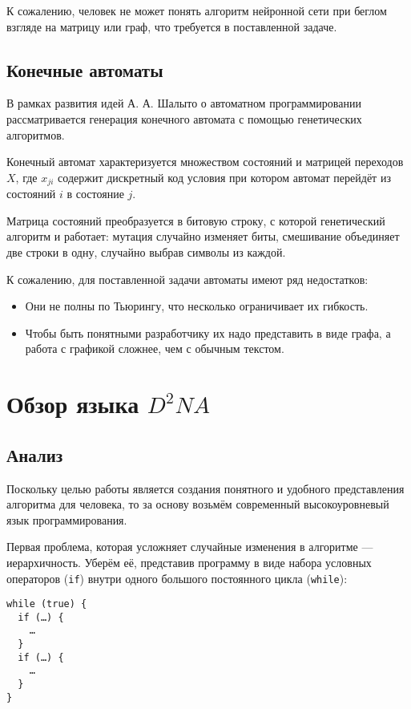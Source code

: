 \documentclass[utf8,a5paper,portrait,10pt]{eskdtext}
\begin{document}
К сожалению, человек не может понять алгоритм нейронной сети при беглом взгляде
на матрицу или граф, что требуется в поставленной задаче.

\subsection{Конечные автоматы}

В рамках развития идей А. А. Шалыто о автоматном программировании
рассматривается генерация конечного автомата с помощью генетических
алгоритмов.\cite{shalyto}

Конечный автомат характеризуется множеством состояний и матрицей переходов $X$,
где $x_{ji}$ содержит дискретный код условия при котором автомат перейдёт из
состояний $i$ в состояние $j$.

Матрица состояний преобразуется в битовую строку, с которой генетический
алгоритм и работает: мутация случайно изменяет биты, смешивание объединяет две
строки в одну, случайно выбрав символы из каждой.

К сожалению, для поставленной задачи автоматы имеют ряд недостатков:
\begin{itemize}
  \item Они не полны по Тьюрингу, что несколько ограничивает их гибкость.
  \item Чтобы быть понятными разработчику их надо представить в виде графа, а
        работа с графикой сложнее, чем с обычным текстом.
\end{itemize}

\newpage
\section{Обзор языка $D^2NA$}

\subsection{Анализ}

Поскольку целью работы является создания понятного и удобного представления
алгоритма для человека, то за основу возьмём современный высокоуровневый язык
программирования.

Первая проблема, которая усложняет случайные изменения в алгоритме —
иерархичность. Уберём её, представив программу в виде набора
условных операторов (\texttt{if}) внутри одного большого постоянного цикла
(\texttt{while}):

\begin{verbatim}
while (true) {
  if (…) {
    …
  }
  if (…) {
    …
  }
}
\end{verbatim}
\end{document}
